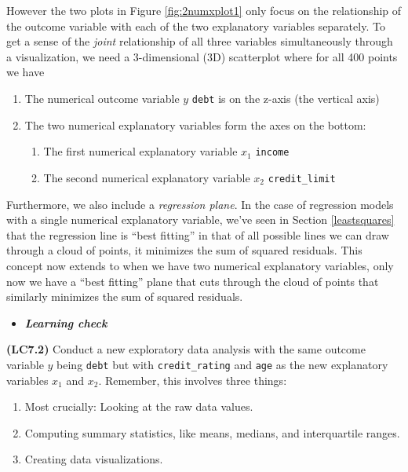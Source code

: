 \documentclass[12pt, krantz2,]{krantz}
\providecommand{\tightlist}{%
  \setlength{\itemsep}{0pt}\setlength{\parskip}{0pt}}
\newenvironment{rmdblock}[1]
  {\begin{shaded*}
  \begin{itemize}
  \renewcommand{\labelitemi}{
    \raisebox{-.7\height}[0pt][0pt]{
    }
  }
  \item
  }
  {
  \end{itemize}
  \end{shaded*}
  }
\newenvironment{learncheck}
  {\begin{rmdblock}{warning}}
  {\end{rmdblock}}
\begin{document}
However the two plots in Figure \ref{fig:2numxplot1} only focus on the relationship of the outcome variable with each of the two explanatory variables separately. To get a sense of the \emph{joint} relationship of all three variables simultaneously through a visualization, we need a 3-dimensional (3D) scatterplot where for all 400 points we have

\begin{enumerate}
\def\labelenumi{\arabic{enumi}.}
\tightlist
\item
  The numerical outcome variable \(y\) \texttt{debt} is on the z-axis (the vertical axis)
\item
  The two numerical explanatory variables form the axes on the bottom:

  \begin{enumerate}
  \def\labelenumii{\arabic{enumii}.}
  \tightlist
  \item
    The first numerical explanatory variable \(x_1\) \texttt{income}
  \item
    The second numerical explanatory variable \(x_2\) \texttt{credit\_limit}
  \end{enumerate}
\end{enumerate}

Furthermore, we also include a \emph{regression plane}. In the case of regression models with a single numerical explanatory variable, we've seen in Section \ref{leastsquares} that the regression line is ``best fitting'' in that of all possible lines we can draw through a cloud of points, it minimizes the sum of squared residuals. This concept now extends to when we have two numerical explanatory variables, only now we have a ``best fitting'' plane that cuts through the cloud of points that similarly minimizes the sum of squared residuals.

\begin{learncheck}
\textbf{\emph{Learning check}}
\end{learncheck}

\textbf{(LC7.2)} Conduct a new exploratory data analysis with the same outcome variable \(y\) being \texttt{debt} but with \texttt{credit\_rating} and \texttt{age} as the new explanatory variables \(x_1\) and \(x_2\). Remember, this involves three things:

\begin{enumerate}
\def\labelenumi{\arabic{enumi}.}
\tightlist
\item
  Most crucially: Looking at the raw data values.
\item
  Computing summary statistics, like means, medians, and interquartile ranges.
\item
  Creating data visualizations.
\end{enumerate}
\end{document}
